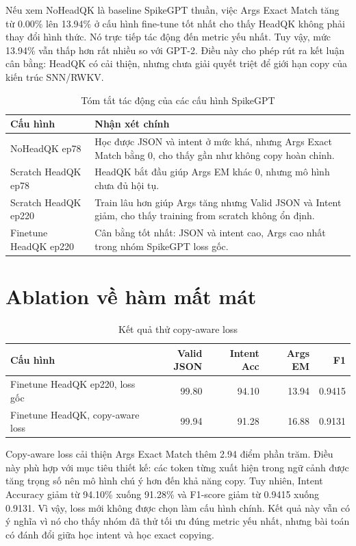 \documentclass[12pt,a4paper,oneside]{report}
\newlength{\manualparindent}
\newcommand{\manualindent}{\hspace*{\manualparindent}}
\begin{document}
\manualindent%
Nếu xem NoHeadQK là baseline SpikeGPT thuần, việc Args Exact Match tăng từ 0.00\% lên 13.94\% ở cấu hình fine-tune tốt nhất cho thấy HeadQK không phải thay đổi hình thức. Nó trực tiếp tác động đến metric yếu nhất. Tuy vậy, mức 13.94\% vẫn thấp hơn rất nhiều so với GPT-2. Điều này cho phép rút ra kết luận cân bằng: HeadQK có cải thiện, nhưng chưa giải quyết triệt để giới hạn copy của kiến trúc SNN/RWKV.

\begin{table}[H]
\centering
\caption{Tóm tắt tác động của các cấu hình SpikeGPT}
\begin{tabularx}{\textwidth}{p{4cm}X}
\toprule
\textbf{Cấu hình} & \textbf{Nhận xét chính} \\
\midrule
NoHeadQK ep78 & Học được JSON và intent ở mức khá, nhưng Args Exact Match bằng 0, cho thấy gần như không copy hoàn chỉnh. \\
Scratch HeadQK ep78 & HeadQK bắt đầu giúp Args EM khác 0, nhưng mô hình chưa đủ hội tụ. \\
Scratch HeadQK ep220 & Train lâu hơn giúp Args tăng nhưng Valid JSON và Intent giảm, cho thấy training from scratch không ổn định. \\
Finetune HeadQK ep220 & Cân bằng tốt nhất: JSON và intent cao, Args cao nhất trong nhóm SpikeGPT loss gốc. \\
\bottomrule
\end{tabularx}
\end{table}

\section{Ablation về hàm mất mát}

\begin{table}[H]
\centering
\caption{Kết quả thử copy-aware loss}
\begin{tabularx}{\textwidth}{Xrrrr}
\toprule
\textbf{Cấu hình} & \textbf{Valid JSON} & \textbf{Intent Acc} & \textbf{Args EM} & \textbf{F1} \\
\midrule
Finetune HeadQK ep220, loss gốc & 99.80 & 94.10 & 13.94 & 0.9415 \\
Finetune HeadQK, copy-aware loss & 99.94 & 91.28 & 16.88 & 0.9131 \\
\bottomrule
\end{tabularx}
\end{table}

\manualindent%
Copy-aware loss cải thiện Args Exact Match thêm 2.94 điểm phần trăm. Điều này phù hợp với mục tiêu thiết kế: các token từng xuất hiện trong ngữ cảnh được tăng trọng số nên mô hình chú ý hơn đến khả năng copy. Tuy nhiên, Intent Accuracy giảm từ 94.10\% xuống 91.28\% và F1-score giảm từ 0.9415 xuống 0.9131. Vì vậy, loss mới không được chọn làm cấu hình chính. Kết quả này vẫn có ý nghĩa vì nó cho thấy nhóm đã thử tối ưu đúng metric yếu nhất, nhưng bài toán có đánh đổi giữa học intent và học exact copying.
\end{document}
